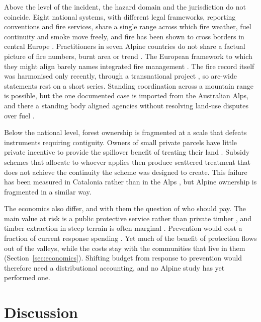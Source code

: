 \documentclass[11pt,a4paper]{article}
\begin{document}
Above the level of the incident, the hazard domain and the jurisdiction do not coincide. Eight national systems, with different legal frameworks, reporting conventions and fire services, share a single range across which fire weather, fuel continuity and smoke move freely, and fire has been shown to cross borders in central Europe \citep{avouris_exposure_2025}. Practitioners in seven Alpine countries do not share a factual picture of fire numbers, burnt area or trend \citep{hoang_stakeholders_2026}. The European framework to which they might align barely names integrated fire management \citep{plana_framing_2024}. The fire record itself was harmonised only recently, through a transnational project \citep{valese_wildfires_2011}, so arc-wide statements rest on a short series. Standing coordination across a mountain range is possible, but the one documented case is imported from the Australian Alps, and there a standing body aligned agencies without resolving land-use disputes over fuel \citep{lockwood_biodiversity_2014}.

Below the national level, forest ownership is fragmented at a scale that defeats instruments requiring contiguity. Owners of small private parcels have little private incentive to provide the spillover benefit of treating their land \citep{bayham_economics_2022}. Subsidy schemes that allocate to whoever applies then produce scattered treatment that does not achieve the continuity the scheme was designed to create. This failure has been measured in Catalonia rather than in the Alps \citep{gorrizmifsud_current_2026}, but Alpine ownership is fragmented in a similar way.

The economics also differ, and with them the question of who should pay. The main value at risk is a public protective service rather than private timber \citep{accastello_asforesee_2019, moos_climate_2021}, and timber extraction in steep terrain is often marginal \citep{dinca_timber_2025}. Prevention would cost a fraction of current response spending \citep{muller_forest_2020}. Yet much of the benefit of protection flows out of the valleys, while the costs stay with the communities that live in them (Section~\ref{sec:economics}). Shifting budget from response to prevention would therefore need a distributional accounting, and no Alpine study has yet performed one.
\section{Discussion}
\label{sec:discussion}
\end{document}
